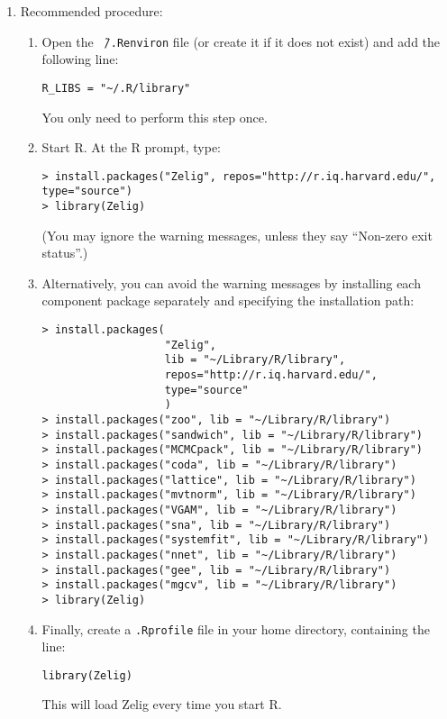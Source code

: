 \begin{enumerate}
\item Recommended procedure: 
  \begin{enumerate}
  \item Open the {\tt \~\,/.Renviron} file (or create it if it does
    not exist) and add the following line:
\begin{verbatim}
R_LIBS = "~/.R/library"
\end{verbatim}
    You only need to perform this step once.
  \item Start R.  At the R prompt, type:
\begin{verbatim}
> install.packages("Zelig", repos="http://r.iq.harvard.edu/", type="source")
> library(Zelig)
\end{verbatim}
(You may ignore the warning messages, unless they say ``Non-zero exit 
status''.)
\item Alternatively, you can avoid the warning messages by installing each 
component package separately and specifying the installation path:  
\begin{verbatim}
> install.packages(
                   "Zelig",
                   lib = "~/Library/R/library",
                   repos="http://r.iq.harvard.edu/",
                   type="source"
                   )
> install.packages("zoo", lib = "~/Library/R/library")
> install.packages("sandwich", lib = "~/Library/R/library")
> install.packages("MCMCpack", lib = "~/Library/R/library")
> install.packages("coda", lib = "~/Library/R/library")
> install.packages("lattice", lib = "~/Library/R/library")
> install.packages("mvtnorm", lib = "~/Library/R/library")
> install.packages("VGAM", lib = "~/Library/R/library")
> install.packages("sna", lib = "~/Library/R/library")
> install.packages("systemfit", lib = "~/Library/R/library")
> install.packages("nnet", lib = "~/Library/R/library")
> install.packages("gee", lib = "~/Library/R/library")
> install.packages("mgcv", lib = "~/Library/R/library")
> library(Zelig)
\end{verbatim}
\item Finally, create a {\tt .Rprofile} file in your home directory, containing the line:
\begin{verbatim}
library(Zelig)
\end{verbatim}
This will load Zelig every time you start R.  
  \end{enumerate}  


\end{enumerate}
